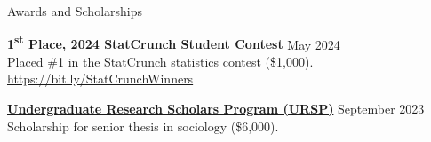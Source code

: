 \documentclass[
	12pt, %
]{resume} %
\begin{document}
\begin{rSection}{Awards and Scholarships}

\textbf{1\textsuperscript{st} Place, 2024 StatCrunch Student Contest} \hfill May 2024\\
\hspace*{20pt}Placed \#1 in the StatCrunch statistics contest (\$\thinspace{}1,000).\\
\hspace*{20pt}\href{https://bit.ly/StatCrunchWinners}{https://bit.ly/StatCrunchWinners}

\href{https://hass.ugresearch.ucla.edu/scholarships/ursp/students/}{\textbf{Undergraduate Research Scholars Program (URSP)}} \hfill September 2023 \\
\hspace*{20pt}Scholarship for senior thesis in sociology (\$\thinspace{}6,000).

\end{rSection}
\end{document}
